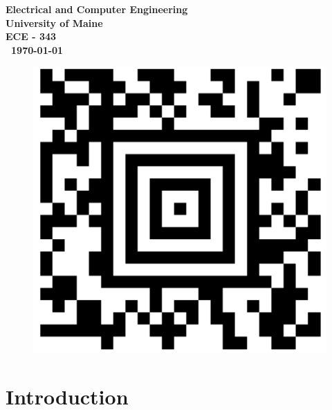 \documentclass{article}
\begin{document}
\begin{titlepage}
\begin{center}
        
        \vspace{03cm}
        \textbf{
        Electrical and Computer Engineering\\
        University of Maine\\
        ECE - 343\\\ \today}
    \vspace{.5cm}
        \begin{figure}[H]
        \centering
        \includegraphics[scale = 0.1]{Images/barcode.png}
\end{figure}
    \end{center}
\end{titlepage}


\tableofcontents

\newpage

\newpage
\listoffigures
\newpage 
\clearpage




\section{Introduction}

  
 
  
\end{document}
